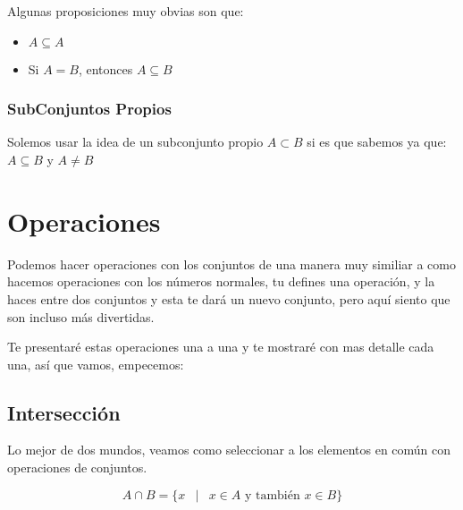 \documentclass[12pt]{report}                                    %
\DeclareMathOperator \Space {\quad}                             %
\DeclareMathOperator \MiniSpace {\;}                            %
\newcommand \Such {\MiniSpace|\MiniSpace}                       %
\begin{document}
                Algunas proposiciones muy obvias son que:
                \begin{itemize}
                    \item $A \subseteq A$
                    \item Si $A = B$, entonces $A \subseteq B$
                \end{itemize}

            \subsubsection{SubConjuntos Propios}

                Solemos usar la idea de un subconjunto propio $A \subset B$ si es que sabemos ya que:
                $A \subseteq B$ y $A \neq B$





    \clearpage
    \section{Operaciones}

        Podemos hacer operaciones con los conjuntos de una manera muy similiar a como hacemos
        operaciones con los números normales, tu defines una operación, y la haces entre dos conjuntos
        y esta te dará un nuevo conjunto,  pero aquí siento que son incluso más divertidas.

        Te presentaré estas operaciones una a una y te mostraré con mas detalle cada una, así 
        que vamos, empecemos:

        \subsection{Intersección}

            Lo mejor de dos mundos, veamos como seleccionar a los elementos en común con operaciones
            de conjuntos.

            \begin{equation}
                A \cap B = \{ x \Such x \in A \text{ y también } x \in B \}
            \end{equation}
\end{document}
